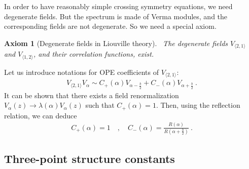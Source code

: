 \documentclass[12pt, a4paper]{article}
\theoremstyle{break}
\newtheorem{hyp}[exo]{Axiom}
\begin{document}
In order to have reasonably simple crossing symmetry equations, we need degenerate fields. But the spectrum is made of Verma modules, and the corresponding fields are not degenerate. So we need a special axiom.

\begin{hyp}[Degenerate fields in Liouville theory]
 ~\label{hyp:degl}
 The degenerate fields $V_{\langle 2, 1\rangle}$ and $V_{\langle 1, 2\rangle}$, and their correlation functions, exist. 
\end{hyp}

Let us introduce notations for OPE coefficients of $V_{\langle 2, 1\rangle}$:
\begin{align}
 V_{\langle 2, 1\rangle} V_\alpha \sim C_+(\alpha) V_{\alpha-\frac{b}{2}} + C_-(\alpha)V_{\alpha +\frac{b}{2}}\ .
\end{align}
It can be shown that there exists a field renormalization $V_\alpha(z) \to \lambda(\alpha)V_\alpha(z)$ such that $C_+(\alpha)=1$. 
Then, using the reflection relation, we can deduce
 \begin{align}
  C_+(\alpha) = 1\quad , \quad C_-(\alpha) = \frac{R(\alpha)}{R(\alpha+\frac{b}{2})}\ .
 \end{align}


\subsection{Three-point structure constants}
\end{document}
